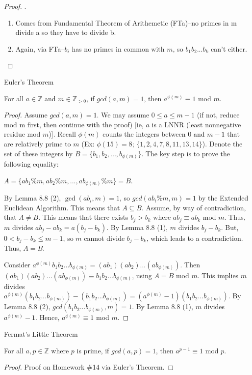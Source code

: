 \begin{proof}.
\begin{enumerate}
\item Comes from Fundamental Theorem of Arithemetic (FTa)--no primes in m divide a so they have to divide b.
\item Again, via FTa--$b_i$ has no primes in common with $m$, so $b_1b_2...b_k$ can't either.
\end{enumerate}
\end{proof}

\begin{theorem} Euler's Theorem

For all $a \in \mathbb{Z}$ and $m \in \mathbb{Z}_{>0}$, if $gcd(a,m) = 1$, then $a^{\phi(m)} \equiv 1$ mod $m$.
\end{theorem}

\begin{proof}
Assume $gcd(a,m) = 1$. We may assume $0 \leq a \leq m - 1$ (if not, reduce mod m first, then continue with the proof) [ie, $a$ is a LNNR (least nonnegative residue mod $m$)]. Recall $\phi(m)$ counts the integers between $0$ and $m - 1$ that are relatively prime to $m$ (Ex: $\phi(15) = 8$; $\{1,2,4,7,8,11,13,14\}$). Denote the set of these integers by $B = \{b_1,b_2,...,b_{\phi(m)}\}$. The key step is to prove the following equality:

\item $A = \{ab_1 \% m, ab_2 \% m,..., ab_{\phi(m)} \% m\} = B$.  

\item By Lemma 8.8 (2), $\gcd(ab_i,m) = 1$, so $gcd(ab_i \% m,m) = 1$ by the Extended Euclidean Algorithm.  This means that $A \subseteq B$. Assume, by way of contradiction, that $A \neq B$. This means that there exists $b_j > b_k$ where $ab_j \equiv ab_k$ mod $m$. Thus, $m$ divides $ab_j - ab_k = a(b_j - b_k)$. By Lemma 8.8 (1), $m$ divides $b_j - b_k$. But, $0 < b_j - b_k \leq m - 1$, so $m$ cannot divide $b_j - b_k$, which leads to a contradiction. Thus, $A = B$.

Consider $a^{\phi(m)}b_1b_2...b_{\phi(m)} = (ab_1)(ab_2)...(ab_{\phi(m)})$. Then $(ab_1)(ab_2)...(ab_{\phi(m)}) \equiv b_1b_2...b_{\phi(m)}$, using $A = B$ mod $m$. This implies $m$ divides $a^{\phi(m)}(b_1b_2...b_{\phi(m)}) - (b_1b_2...b_{\phi(m)}) = (a^{\phi(m)} - 1)(b_1b_2...b_{\phi(m)})$. By Lemma 8.8 (2), $gcd(b_1b_2...b_{\phi(m)},m) = 1$. By Lemma 8.8 (1), $m$ divides $a^{\phi(m)} - 1$. Hence, $a^{\phi(m)} \equiv 1$ mod $m$.

\end{proof}

\begin{theorem} Fermat's Little Theorem

For all $a,p \in \mathbb{Z}$ where $p$ is prime, if $gcd(a,p) = 1$, then $a^{p-1} \equiv 1$ mod $p$.

\end{theorem}

\begin{proof} Proof on Homework \#14 via Euler's Theorem.
\end{proof}


